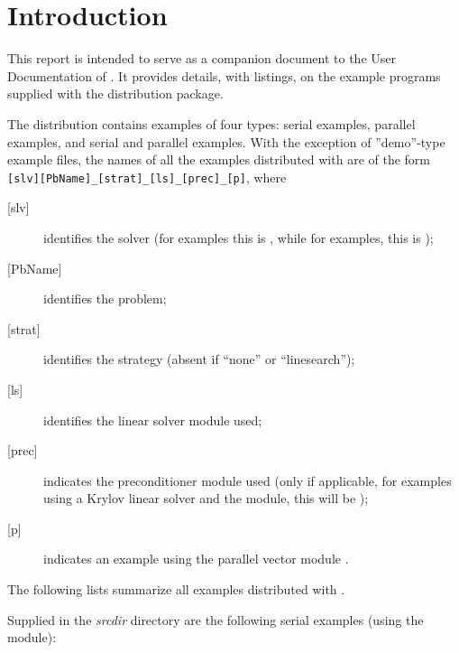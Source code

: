 \section{Introduction}\label{s:ex_intro}

This report is intended to serve as a companion document to the User
Documentation of {\kinsol} \cite{kinsol_ug}.  It provides details, with
listings, on the example programs supplied with the {\kinsol} distribution
package.

The {\kinsol} distribution contains examples of four types: serial
{\C} examples, parallel {\C} examples, and serial and parallel {\F}
examples.
With the exception of ''demo''-type example files, the names of all the examples 
distributed with {\sundials} are of the form
\verb![slv][PbName]_[strat]_[ls]_[prec]_[p]!, where
\begin{description}
\item [{[slv]}] identifies the solver (for {\kinsol} examples this is , 
  while for {\fkinsol} examples, this is );
\item [{[PbName]}] identifies the problem;
\item [{[strat]}] identifies the strategy (absent if ``none'' or ``linesearch'');
\item [{[ls]}] identifies the linear solver module used;
\item [{[prec]}] indicates the {\kinsol} preconditioner module used
  (only if applicable, for examples using a Krylov linear solver
  and the {\kinbbdpre} module, this will be );
\item [{[p]}] indicates an example using the parallel vector module {\nvecp}.
\end{description}

\vspace{0.2in}\noindent
The following lists summarize all examples distributed with {\kinsol}.

\vspace{0.2in}\noindent
Supplied in the {\em srcdir} directory are the
following serial examples (using the {\nvecs} module):

